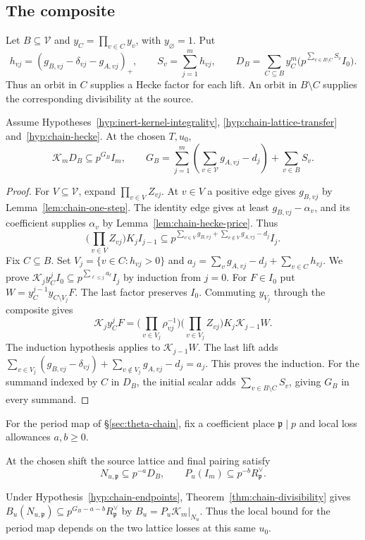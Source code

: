 \subsection{The composite}

Let $B\subseteq\mathcal V$ and $y_C=\prod_{v\in C}y_v$, with
$y_\varnothing=1$. Put
\[
 h_{vj}=(g_{B,vj}-\delta_{vj}-g_{A,vj})_+,\qquad
 S_v=\sum_{j=1}^m h_{vj},\qquad
 D_B=\sum_{C\subseteq B} y_C^m
       \bigl(p^{\sum_{v\in B\setminus C}S_v} I_0\bigr).
\]
Thus an orbit in $C$ supplies a Hecke factor for each lift. An orbit
in $B\setminus C$ supplies the corresponding divisibility at the source.

\begin{theorem}\label{thm:chain-divisibility}
Assume Hypotheses~\ref{hyp:inert-kernel-integrality},
\ref{hyp:chain-lattice-transfer} and~\ref{hyp:chain-hecke}. At the
chosen $T,u_0$,
\[
 \mathcal K_m D_B\subseteq p^{G_B} I_m,\qquad
 G_B=\sum_{j=1}^m\left(\sum_{v\in\mathcal V}g_{A,vj}-d_j\right)
          +\sum_{v\in B}S_v .
\]
\end{theorem}

\begin{proof}
For $V\subseteq\mathcal V$, expand $\prod_{v\in V} Z_{vj}$.
At $v\in V$ a positive edge gives $g_{B,vj}$ by Lemma~\ref{lem:chain-one-step}.
The identity edge gives at least $g_{B,vj}-\alpha_v$, and its coefficient
supplies $\alpha_v$ by Lemma~\ref{lem:chain-hecke-price}. Thus
\[
 \Big(\prod_{v\in V}Z_{vj}\Big)K_j I_{j-1}
 \subseteq p^{\sum_{v\in V}g_{B,vj}+\sum_{v\notin V}g_{A,vj}-d_j}I_j .
\]
Fix $C\subseteq B$. Set $V_j=\{v\in C:h_{vj}>0\}$ and
$a_j=\sum_v g_{A,vj}-d_j+\sum_{v\in C}h_{vj}$.
We prove $\mathcal K_j y_C^j I_0\subseteq p^{\sum_{\ell\le j}a_\ell}I_j$
by induction from $j=0$. For $F\in I_0$ put
$W=y_C^{j-1}y_{C\setminus V_j}F$. The last factor preserves $I_0$.
Commuting $y_{V_j}$ through the composite gives
\[
 \mathcal K_j y_C^j F
   =\Big(\prod_{v\in V_j}\rho_{vj}^{-1}\Big)
     \Big(\prod_{v\in V_j}Z_{vj}\Big)K_j\mathcal K_{j-1}W .
\]
The induction hypothesis applies to $\mathcal K_{j-1}W$. The last
lift adds $\sum_{v\in V_j}(g_{B,vj}-\delta_{vj})
+\sum_{v\notin V_j}g_{A,vj}-d_j=a_j$. This proves the induction.
For the summand indexed by $C$ in $D_B$, the initial scalar adds
$\sum_{v\in B\setminus C}S_v$, giving $G_B$ in every summand.
\end{proof}

For the period map of \S\ref{sec:theta-chain}, fix a coefficient place
$\mathfrak p\mid p$ and local loss allowances $a,b\ge0$.

\begin{hypothesis}[\openinput]\label{hyp:chain-endpoints}
At the chosen shift the source lattice and final pairing satisfy
\[
 N_{u,\mathfrak p}\subseteq p^{-a}D_B,\qquad
 P_u(I_m)\subseteq p^{-b}R^\vee_{\mathfrak p}.
\]
\end{hypothesis}

Under Hypothesis~\ref{hyp:chain-endpoints}, Theorem~\ref{thm:chain-divisibility}
gives $B_u(N_{u,\mathfrak p})\subseteq p^{G_B-a-b}R^\vee_{\mathfrak p}$
by $B_u=P_u\mathcal K_m|_{N_u}$. Thus the local bound for the period
map depends on the two lattice losses at this same $u_0$.

